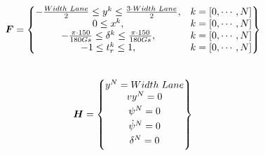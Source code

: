 \begin{equation}\label{eq:F}
\bm{F} =
\begin{Bmatrix}
-\frac{Width\hspace{1mm}Lane}{2} \leq y^k \leq \frac{3\cdot Width\hspace{1mm}Lane}{2}, & k = [0,\cdots, N] \\
0 \leq x^k, & k = [0,\cdots, N] \\
-\frac{\pi\cdot 150}{180 Gs} \leq \delta^k \leq \frac{\pi\cdot 150}{180 Gs}, & k = [0,\cdots, N] \\
-1 \leq t_r^k \leq 1, & k = [0,\cdots, N]

\end{Bmatrix}
\end{equation}\\

\begin{equation}\label{eq:H}
\bm{H} =
\begin{Bmatrix}
y^N = Width\hspace{1mm}Lane \\ \vspace{1mm}
vy^N = 0 \\\vspace{1mm}
\psi^N = 0 \\\vspace{1mm}
\dot{\psi}^N = 0 \\\vspace{1mm}
\delta^N = 0 

\end{Bmatrix}
\end{equation}\vspace{5mm}

